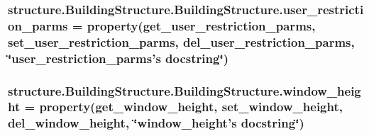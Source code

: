 \hypertarget{classstructure_1_1_building_structure_1_1_building_structure_a033a12dd353060d177088eeb3d7854f1}{
\subsubsection[{user\-\_\-restriction\-\_\-parms}]{\setlength{\rightskip}{0pt plus 5cm}structure.\-Building\-Structure.\-Building\-Structure.\-user\-\_\-restriction\-\_\-parms = property({\bf get\-\_\-user\-\_\-restriction\-\_\-parms}, {\bf set\-\_\-user\-\_\-restriction\-\_\-parms}, {\bf del\-\_\-user\-\_\-restriction\-\_\-parms}, \char`\"{}user\-\_\-restriction\-\_\-parms's docstring\char`\"{})\hspace{0.3cm}{\ttfamily [static]}}}\label{classstructure_1_1_building_structure_1_1_building_structure_a033a12dd353060d177088eeb3d7854f1}
\hypertarget{classstructure_1_1_building_structure_1_1_building_structure_ae4e964b22b13b2d89f994146c5a34708}{
\subsubsection[{window\-\_\-height}]{\setlength{\rightskip}{0pt plus 5cm}structure.\-Building\-Structure.\-Building\-Structure.\-window\-\_\-height = property({\bf get\-\_\-window\-\_\-height}, {\bf set\-\_\-window\-\_\-height}, {\bf del\-\_\-window\-\_\-height}, \char`\"{}window\-\_\-height's docstring\char`\"{})\hspace{0.3cm}{\ttfamily [static]}}}\label{classstructure_1_1_building_structure_1_1_building_structure_ae4e964b22b13b2d89f994146c5a34708}
